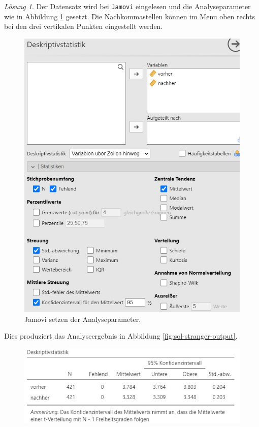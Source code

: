 \documentclass[
]{book}
\theoremstyle{definition}
\theoremstyle{definition}
\theoremstyle{definition}
\theoremstyle{definition}
\theoremstyle{remark}
\newtheorem*{solution}{Lösung}
\begin{document}
\begin{solution}

Der Datensatz wird bei \texttt{Jamovi} eingelesen und die Analyseparameter wie in Abbildung \ref{fig:sol-stranger-input} gesetzt. Die Nachkommastellen können im Menu oben rechts bei den drei vertikalen Punkten eingestellt werden.

\begin{figure}

{\centering \includegraphics[width=1\linewidth]{figures/04-exr-stranger-jmv-input} 

}

\caption{Jamovi setzen der Analyseparameter.}\label{fig:sol-stranger-input}
\end{figure}

Dies produziert das Analyseergebnis in Abbildung \ref{fig:sol-stranger-output}.

\begin{figure}

{\centering \includegraphics[width=1\linewidth]{figures/04-exr-stranger-jmv-output} 

}
\end{figure}
\end{solution}
\end{document}
